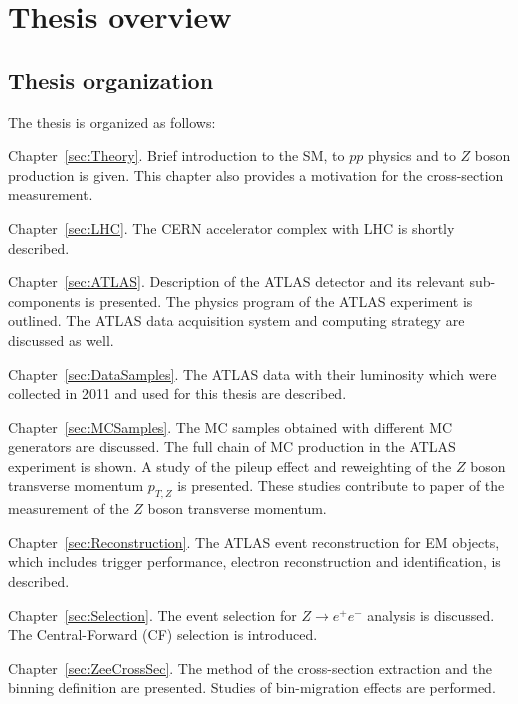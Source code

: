 \chapter{Thesis overview}
\label{sec:TOverview}

\section{Thesis organization}
\label{sec:TOrganization}

The thesis is organized as follows:
\begin{description}
\item Chapter~\ref{sec:Theory}. Brief introduction to the SM, to $pp$ physics and to $Z$ boson production is given. This chapter also provides a motivation for the \Zee cross-section measurement.

\item Chapter~\ref{sec:LHC}. The CERN accelerator complex with LHC is shortly described.

\item Chapter~\ref{sec:ATLAS}. Description of the ATLAS detector and its relevant sub-components is presented. The physics program of the ATLAS experiment is outlined. The ATLAS data acquisition system and computing strategy are discussed as well.

\item Chapter~\ref{sec:DataSamples}. The ATLAS data with their luminosity which were collected in 2011 and used for this thesis are described.

\item Chapter~\ref{sec:MCSamples}. The MC samples obtained with different MC generators are discussed. The full chain of MC production in the ATLAS experiment is shown. A study of the pileup effect and reweighting of the $Z$ boson transverse momentum $p_{T,Z}$ is presented. These studies contribute to paper of the measurement of the $Z$ boson transverse momentum.

\item Chapter~\ref{sec:Reconstruction}. The ATLAS event reconstruction for EM objects, which includes trigger performance, electron reconstruction and identification, is described.

\item Chapter~\ref{sec:Selection}. The event selection for $Z \to e^+e^-$ analysis is discussed. The Central-Forward (CF) selection is introduced.

\item Chapter~\ref{sec:ZeeCrossSec}. The method of the cross-section extraction and the binning definition are presented. Studies of bin-migration effects are performed.


\end{description}
